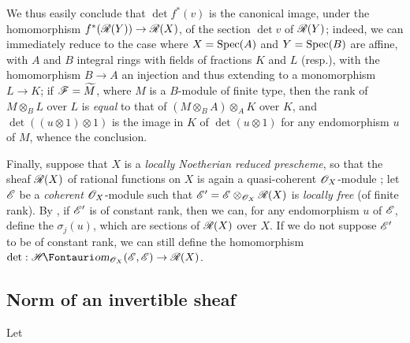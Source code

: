 \begin{env}[6.4.9]
We thus easily conclude that $\det f^*(v)$ is the canonical image, under the homomorphism $f^*(\sh{R}(Y))\to\sh{R}(X)$, of the section $\det v$ of $\mathscr{R}(Y)$;
indeed, we can immediately reduce to the case where $X=\operatorname{Spec}(A)$ and $Y=\operatorname{Spec}(B)$ are affine, with $A$ and $B$ integral rings with fields of fractions $K$ and $L$ (resp.), with the homomorphism $B\to A$ an injection and thus extending to a monomorphism $L\to K$;
if $\mathscr{F}=\widetilde{M}$, where $M$ is a $B$-module of finite type, then the rank of $M\otimes_B L$ over $L$ is \emph{equal} to that of $(M\otimes_B A)\otimes_A K$ over $K$, and $\det((u\otimes1)\otimes1)$ is the image in $K$ of $\det(u\otimes1)$ for any endomorphism $u$ of $M$, whence the conclusion.
\end{env}

\begin{env}[6.4.10]
\label{II.6.4.10}
Finally, suppose that $X$ is a \emph{locally Noetherian reduced prescheme}, so that the sheaf $\mathscr{R}(X)$ of rational functions on $X$ is again a quasi-coherent $\mathscr{O}_X$-module ;
let $\mathscr{E}$ be a \emph{coherent} $\mathscr{O}_X$-module such that $\mathscr{E}'=\mathscr{E}\otimes_{\mathscr{O}_X}\mathscr{R}(X)$ is \emph{locally free} (of finite rank).
By , if $\mathscr{E}'$ is of constant rank, then we can, for any endomorphism $u$ of $\mathscr{E}$, define the $\sigma_j(u)$, which are sections of $\mathscr{R}(X)$ over $X$.
If we do not suppose $\mathscr{E}'$ to be of constant rank, we can still define the homomorphism $\det:\shHom_{\sh{O}_X}(\sh{E},\sh{E})\to\sh{R}(X)$.
\end{env}


\subsection{Norm of an invertible sheaf}
\label{subsection:II.6.5}

\begin{env}[6.5.1]
\label{II.6.5.1}
Let
\end{env}




